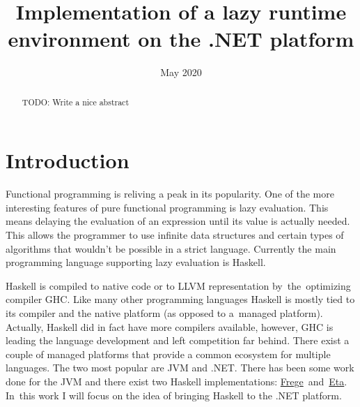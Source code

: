 \documentclass[en]{pracamgr}
\title{Implementation of a lazy runtime environment on the .NET platform}
\date{May 2020}
\begin{document}
\maketitle

\begin{abstract}
  TODO: Write a nice abstract
\end{abstract}

\tableofcontents

\chapter*{Introduction}

Functional programming is reliving a peak in its popularity.
One of the more interesting features of pure functional programming
is lazy evaluation. This means delaying the evaluation of an expression
until its value is actually needed. This allows the programmer to use
infinite data structures and certain types of algorithms that wouldn't
be possible in a strict language. Currently the main programming language
supporting lazy evaluation is Haskell.

Haskell is compiled to native code or to LLVM representation by~the~optimizing
compiler GHC. Like many other programming languages Haskell is mostly
tied to its compiler and the native platform (as opposed to a~managed platform).
Actually, Haskell did in fact have more compilers available, however,
GHC is leading the language development and left competition far behind.
There exist a couple of managed platforms that provide a common ecosystem
for multiple languages. The two most popular are JVM and .NET.
There has been some work done for the JVM \cite{Tullsen} \cite{Choi} \cite{Alliet}
and there exist two Haskell implementations: 
\href{https://github.com/Frege/frege}{Frege}~and~\href{https://eta-lang.org/}{Eta}.
In~this work I will focus on the idea of bringing
Haskell to the .NET platform. \\
\end{document}
